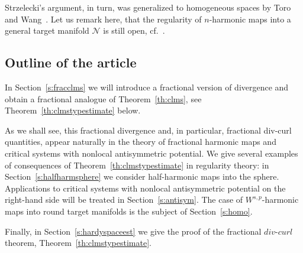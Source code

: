 \documentclass[12pt]{amsart}
\theoremstyle{definition}
\numberwithin{theorem}{section} \numberwithin{equation}{section}
\begin{document}
Strzelecki's argument, in turn, was generalized to homogeneous spaces by Toro and Wang~\cite{Toro-Wang}.
Let us remark here, that the regularity of $n$-harmonic maps into a general target manifold $\mathcal{N}$ is still open, cf.~\cite{Schikorra-Strzelecki-2016}.
% 
\subsection*{Outline of the article}
In Section~\ref{s:fracclms} we will introduce a fractional version of divergence and obtain a fractional analogue of Theorem~\ref{th:clms}, see Theorem~\ref{th:clmstypestimate} below.

As we shall see, this fractional divergence and, in particular, fractional div-curl quantities, appear naturally in the theory of fractional harmonic maps and critical systems with nonlocal antisymmetric potential. We give several examples of consequences of Theorem~\ref{th:clmstypestimate} in regularity theory:
in Section~\ref{s:halfharmsphere} we consider half-harmonic maps into the sphere. Applications to critical systems with nonlocal antisymmetric potential on the right-hand side will be treated in Section~\ref{s:antisym}. The case of $W^{s,p}$-harmonic maps into round target manifolds is the subject of Section~\ref{s:homo}.

Finally, in Section~\ref{s:hardyspaceest} we give the proof of the fractional $div$-$curl$ theorem, Theorem~\ref{th:clmstypestimate}.
\end{document}
